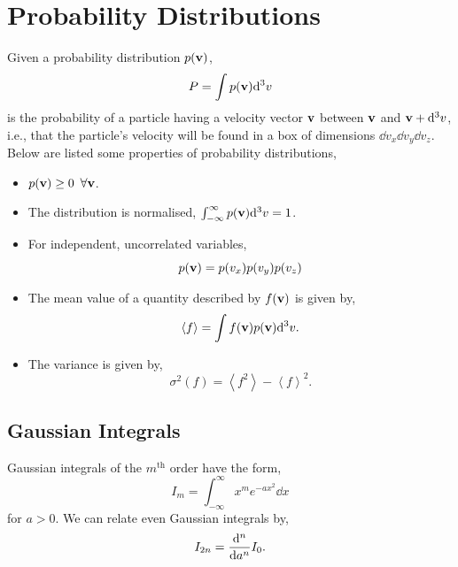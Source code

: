 \documentclass{book}
\begin{document}
\section{Probability Distributions}
Given a probability distribution $p(\vb{v})$,
\begin{equation}
	P = \int p(\vb{v}) \dd^3v
\end{equation}
is the probability of a particle having a velocity vector $\vb{v}$ between $\vb{v}$ and $\vb{v} + \dd^3v$, i.e., that the particle's velocity will be found in a box of dimensions $\dd{v}_x\dd{v}_y\dd{v}_z$. Below are listed some properties of probability distributions,
\begin{itemize}
	\item $p(\vb{v}) \geq 0$ $\forall \vb{v}$.
	\item The distribution is normalised, $\int_{-\infty}^{\infty} p(\vb{v})\dd^3v = 1$.
	\item For independent, uncorrelated variables,
	\begin{equation}
		p(\vb{v}) = p(v_x)p(v_y)p(v_z)
	\end{equation}
	\item The mean value of a quantity described by $f(\vb{v})$ is given by,
	\begin{equation}
		\left<f\right> = \int f(\vb{v})p(\vb{v})\dd^3v.
	\end{equation}
	\item The variance is given by,
	\begin{equation}
		\sigma^2(f) = \left<f^2\right> - \left<f\right>^2.
	\end{equation}
\end{itemize}
\subsection{Gaussian Integrals}
Gaussian integrals of the $m^{\text{th}}$ order have the form,
\begin{equation}
	I_m = \int_{-\infty}^{\infty}x^{m}e^{-ax^2}\dd{x}
\end{equation}
for $a > 0$. We can relate even Gaussian integrals by,
\begin{equation}
	I_{2n} = \dv[n]{a}I_0.
\end{equation}
\end{document}
